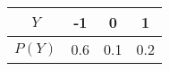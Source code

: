 \begin{tabular}{|c|c|c|c|} 
    \hline
    $Y$ & -1 & 0 & 1 \\ 
    \hline
    $P(Y)$ & 0.6 & 0.1 & 0.2 \\ 
    \hline
\end{tabular}
